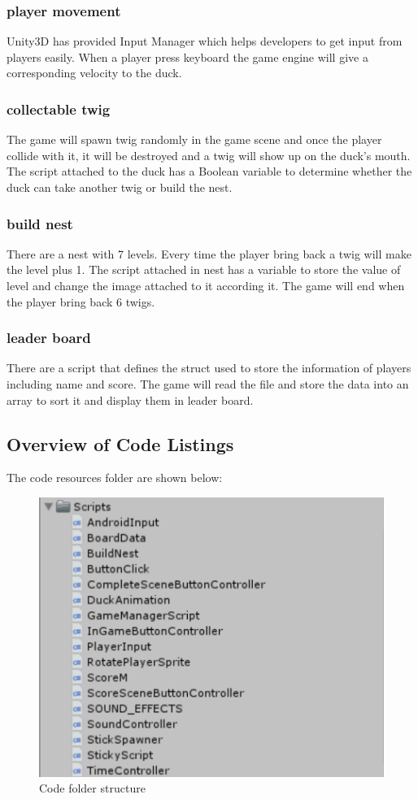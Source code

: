 \documentclass[12pt]{article}
\begin{document}
\subsubsection{player movement}
Unity3D has provided Input Manager which helps developers to get input from players easily. When a player press keyboard the game engine will give a corresponding velocity to the duck. 
\subsubsection{collectable twig}
The game will spawn twig randomly in the game scene and once the player collide with it, it will be destroyed and a twig will show up on the duck's mouth. The script attached to the duck has a Boolean variable to determine whether the duck can take another twig or build the nest.
\subsubsection{build nest}
There are a nest with 7 levels. Every time the player bring back a twig will make the level plus 1. The script attached in nest has a variable to store the value of level and change the image attached to it according it. The game will end when the player bring back 6 twigs.
\subsubsection{leader board}
There are a script that defines the struct used to store the information of players including name and score. The game will read the file and store the data into an array to sort it and display them in leader board.

\subsection{Overview of Code Listings}
The code resources folder are shown below:

\begin{figure}[H]
\centering
\includegraphics{coderesource.png}
\caption{Code folder structure}
\end{figure}
\end{document}

